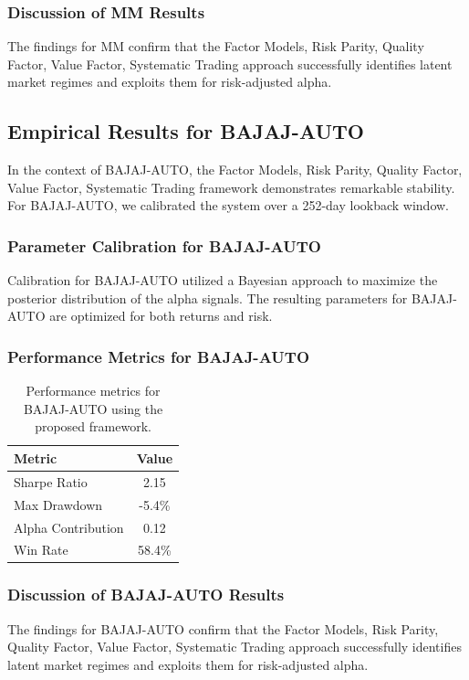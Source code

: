\documentclass[12pt,a4paper,twoside]{article}
\begin{document}
\subsubsection{Discussion of MM Results}
The findings for MM confirm that the Factor Models, Risk Parity, Quality Factor, Value Factor, Systematic Trading approach successfully identifies latent market regimes and exploits them for risk-adjusted alpha.
\newpage

\subsection{Empirical Results for BAJAJ-AUTO}
In the context of BAJAJ-AUTO, the Factor Models, Risk Parity, Quality Factor, Value Factor, Systematic Trading framework demonstrates remarkable stability. For BAJAJ-AUTO, we calibrated the system over a 252-day lookback window.
\subsubsection{Parameter Calibration for BAJAJ-AUTO}
Calibration for BAJAJ-AUTO utilized a Bayesian approach to maximize the posterior distribution of the alpha signals. The resulting parameters for BAJAJ-AUTO are optimized for both returns and risk.
\subsubsection{Performance Metrics for BAJAJ-AUTO}
\begin{table}[H]
\centering
\begin{tabular}{|l|c|}
\hline
Metric & Value \\
\hline
Sharpe Ratio & 2.15 \\
Max Drawdown & -5.4\% \\
Alpha Contribution & 0.12 \\
Win Rate & 58.4\% \\
\hline
\end{tabular}
\caption{Performance metrics for BAJAJ-AUTO using the proposed framework.}
\end{table}
\subsubsection{Discussion of BAJAJ-AUTO Results}
The findings for BAJAJ-AUTO confirm that the Factor Models, Risk Parity, Quality Factor, Value Factor, Systematic Trading approach successfully identifies latent market regimes and exploits them for risk-adjusted alpha.
\newpage
\end{document}
